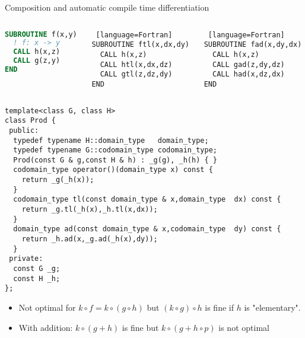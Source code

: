 \documentclass[9pt]{beamer}
\begin{document}

\begin{frame}[fragile]{Composition and automatic compile time differentiation}
\begin{columns}
\begin{column}{0.3\textwidth}
\begin{lstlisting}[language=Fortran]
SUBROUTINE f(x,y)
  ! f: x -> y
  CALL h(x,z)
  CALL g(z,y)
END
\end{lstlisting}
\end{column}
\begin{column}{0.3\textwidth}
\begin{lstlisting} [language=Fortran]
SUBROUTINE ftl(x,dx,dy)
  CALL h(x,z)
  CALL htl(x,dx,dz)
  CALL gtl(z,dz,dy)
END
\end{lstlisting}
\end{column}
\begin{column}{0.3\textwidth}
\begin{lstlisting} [language=Fortran]
SUBROUTINE fad(x,dy,dx)
  CALL h(x,z)
  CALL gad(z,dy,dz)
  CALL had(x,dz,dx)
END
\end{lstlisting}
\end{column}
\end{columns}
\pause
\begin{lstlisting}
template<class G, class H>
class Prod {
 public:
  typedef typename H::domain_type   domain_type;
  typedef typename G::codomain_type codomain_type;
  Prod(const G & g,const H & h) : _g(g), _h(h) { }
  codomain_type operator()(domain_type x) const {
    return _g(_h(x));
  }
  codomain_type tl(const domain_type & x,domain_type  dx) const {
    return _g.tl(_h(x),_h.tl(x,dx));
  }
  domain_type ad(const domain_type & x,codomain_type  dy) const {
    return _h.ad(x,_g.ad(_h(x),dy));
  }
 private:
  const G _g;
  const H _h;
};
\end{lstlisting}
\pause
\begin{itemize}
\item Not optimal for $k \circ f = k \circ (g \circ h)$ but $(k \circ g) \circ h$ is fine if $h$ is "elementary".
\item With addition: $k \circ (g + h)$ is fine but  $k \circ (g + h \circ p)$ is not optimal
\end{itemize}


\end{frame}
\end{document}
